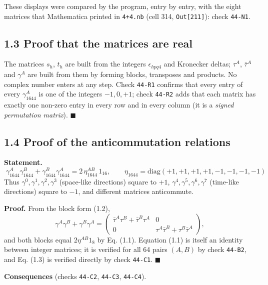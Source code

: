 \documentclass[
  10pt,
]{article}
\begin{document}
These displays were compared by the program, entry by entry, with the
eight matrices that Mathematica printed in \texttt{4+4.nb} (cell 314,
\texttt{Out{[}211{]}}): check \texttt{44-N1}.

\hypertarget{proof-that-the-matrices-are-real}{%
\subsection{1.3 Proof that the matrices are
real}\label{proof-that-the-matrices-are-real}}

The matrices \(s_h\), \(t_h\) are built from the integers
\(\epsilon_{hpq4}\) and Kronecker deltas; \(\tau^A\), \(\bar\tau^A\) and
\(\gamma^A\) are built from them by forming blocks, transposes and
products. No complex number enters at any step. Check \texttt{44-R1}
confirms that every entry of every \(\gamma_{1644}^A\) is one of the
integers \(-1,0,+1\); check \texttt{44-R2} adds that each matrix has
exactly one non-zero entry in every row and in every column (it is a
\emph{signed permutation matrix}). \(\blacksquare\)

\hypertarget{proof-of-the-anticommutation-relations}{%
\subsection{1.4 Proof of the anticommutation
relations}\label{proof-of-the-anticommutation-relations}}

\textbf{Statement.}
\[\boxed{\;\gamma_{1644}^A\gamma_{1644}^B+\gamma_{1644}^B\gamma_{1644}^A=2\,\eta_{1644}^{AB}\,1_{16},\qquad
\eta_{1644}=\mathrm{diag}(+1,+1,+1,+1,-1,-1,-1,-1)\;}\tag{1.3}\] Thus
\(\gamma^0,\gamma^1,\gamma^2,\gamma^3\) (space-like directions) square
to \(+1\), \(\gamma^4,\gamma^5,\gamma^6,\gamma^7\) (time-like
directions) square to \(-1\), and different matrices anticommute.

\textbf{Proof.} From the block form (1.2),
\[\gamma^A\gamma^B+\gamma^B\gamma^A=\begin{pmatrix}\bar\tau^A\tau^B+\bar\tau^B\tau^A&0\\0&\tau^A\bar\tau^B+\tau^B\bar\tau^A\end{pmatrix},\]
and both blocks equal \(2\eta^{AB}1_8\) by Eq. (1.1). Equation (1.1) is
itself an identity between integer matrices; it is verified for all 64
pairs \((A,B)\) by check \texttt{44-B2}, and Eq. (1.3) is verified
directly by check \texttt{44-C1}. \(\blacksquare\)

\textbf{Consequences} (checks \texttt{44-C2}, \texttt{44-C3},
\texttt{44-C4}).
\end{document}
